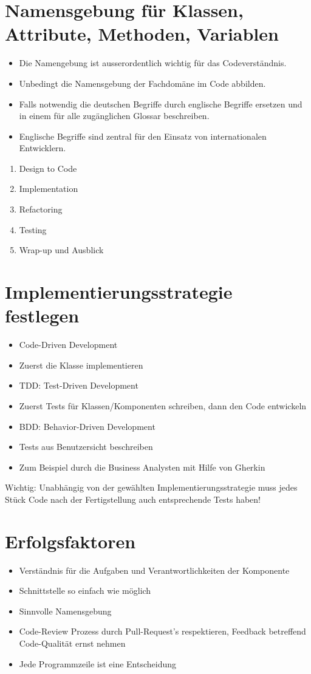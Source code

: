 \documentclass[10pt]{article}
\begin{document}
\section*{Namensgebung für Klassen, Attribute, Methoden, Variablen}
\begin{itemize}
  \item Die Namengebung ist ausserordentlich wichtig für das Codeverständnis.
  \item Unbedingt die Namensgebung der Fachdomäne im Code abbilden.
  \item Falls notwendig die deutschen Begriffe durch englische Begriffe ersetzen und in einem für alle zugänglichen Glossar beschreiben.
  \item Englische Begriffe sind zentral für den Einsatz von internationalen Entwicklern.
\end{itemize}

\begin{enumerate}
  \item Design to Code
  \item Implementation
  \item Refactoring
  \item Testing
  \item Wrap-up und Ausblick
\end{enumerate}

\section*{Implementierungsstrategie festlegen}
\begin{itemize}
  \item Code-Driven Development
  \item Zuerst die Klasse implementieren
  \item TDD: Test-Driven Development
  \item Zuerst Tests für Klassen/Komponenten schreiben, dann den Code entwickeln
  \item BDD: Behavior-Driven Development
  \item Tests aus Benutzersicht beschreiben
  \item Zum Beispiel durch die Business Analysten mit Hilfe von Gherkin
\end{itemize}

Wichtig: Unabhängig von der gewählten Implementierungsstrategie muss jedes Stück Code nach der Fertigstellung auch entsprechende Tests haben!

\section*{Erfolgsfaktoren}
\begin{itemize}
  \item Verständnis für die Aufgaben und Verantwortlichkeiten der Komponente
  \item Schnittstelle so einfach wie möglich
  \item Sinnvolle Namensgebung
  \item Code-Review Prozess durch Pull-Request's respektieren, Feedback betreffend Code-Qualität ernst nehmen
  \item Jede Programmzeile ist eine Entscheidung
\end{itemize}
\end{document}
